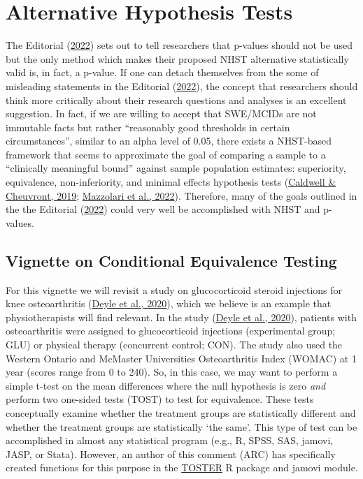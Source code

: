 \documentclass[]{cik}%
\begin{document}
\hypertarget{alternative-hypothesis-tests}{%
\section{Alternative Hypothesis
Tests}\label{alternative-hypothesis-tests}}

The Editorial (\protect\hyperlink{ref-elkins2022}{2022}) sets out to
tell researchers that p-values should not be used but the only method
which makes their proposed NHST alternative statistically valid is, in
fact, a p-value. If one can detach themselves from the some of
misleading statements in the Editorial
(\protect\hyperlink{ref-elkins2022}{2022}), the concept that researchers
should think more critically about their research questions and analyses
is an excellent suggestion. In fact, if we are willing to accept that
SWE/MCIDs are not immutable facts but rather ``reasonably good
thresholds in certain circumstances'', similar to an alpha level of
0.05, there exists a NHST-based framework that seems to approximate the
goal of comparing a sample to a ``clinically meaningful bound'' against
sample population estimates: superiority, equivalence, non-inferiority,
and minimal effects hypothesis tests
(\protect\hyperlink{ref-caldwell2019}{Caldwell \& Cheuvront, 2019};
\protect\hyperlink{ref-mazzolari2022}{Mazzolari et al., 2022}).
Therefore, many of the goals outlined in the the Editorial
(\protect\hyperlink{ref-elkins2022}{2022}) could very well be
accomplished with NHST and p-values.

\hypertarget{vignette-on-conditional-equivalence-testing}{%
\subsection{Vignette on Conditional Equivalence
Testing}\label{vignette-on-conditional-equivalence-testing}}

For this vignette we will revisit a study on glucocorticoid steroid
injections for knee osteoarthritis (\protect\hyperlink{ref-vigex}{Deyle
et al., 2020}), which we believe is an example that physiotherapists
will find relevant. In the study (\protect\hyperlink{ref-vigex}{Deyle et
al., 2020}), patients with osteoarthritis were assigned to
glucocorticoid injections (experimental group; GLU) or physical therapy
(concurrent control; CON). The study also used the Western Ontario and
McMaster Universities Osteoarthritis Index (WOMAC) at 1 year (scores
range from 0 to 240). So, in this case, we may want to perform a simple
t-test on the mean differences where the null hypothesis is zero
\emph{and} perform two one-sided tests (TOST) to test for equivalence.
These tests conceptually examine whether the treatment groups are
statistically different and whether the treatment groups are
statistically `the same'. This type of test can be accomplished in
almost any statistical program (e.g., R, SPSS, SAS, jamovi, JASP, or
Stata). However, an author of this comment (ARC) has specifically
created functions for this purpose in the
\href{https://aaroncaldwell.us/TOSTERpkg}{TOSTER} R package and jamovi
module.
\end{document}

